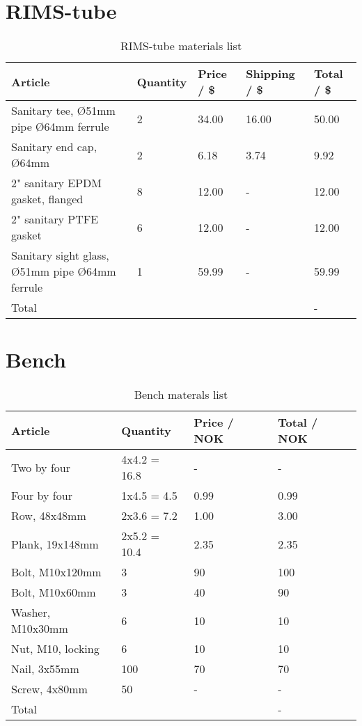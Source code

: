 \documentclass[11pt,fleqn,openany]{book} %
\begin{document}
\newpage

\section{RIMS-tube}

\begin{table}[ht!]
\centering
\begin{tabular}{l l l l l}
\toprule
Article & Quantity & Price / \$ & Shipping / \$ & Total / \$\\
\midrule
Sanitary tee, Ø51mm pipe Ø64mm ferrule & 2 & 34.00 & 16.00 & 50.00 \\
Sanitary end cap, Ø64mm & 2 & 6.18 & 3.74 & 9.92 \\
2" sanitary EPDM gasket, flanged & 8 & 12.00 & - & 12.00 \\
2" sanitary PTFE gasket & 6 & 12.00 & - & 12.00 \\
Sanitary sight glass, Ø51mm pipe Ø64mm ferrule & 1 & 59.99 & - & 59.99\\
\bottomrule
Total & & & & -\\
\end{tabular}
\caption{RIMS-tube materials list}
\end{table}

\section{Bench}

\begin{table}[ht!]
\centering
\begin{tabular}{l l l l}
\toprule
Article & Quantity & Price / NOK & Total / NOK\\
\midrule
Two by four & 4x4.2 = 16.8 & - & - \\
Four by four & 1x4.5 = 4.5 & 0.99 & 0.99 \\
Row, 48x48mm & 2x3.6 = 7.2 & 1.00 & 3.00 \\
Plank, 19x148mm & 2x5.2 = 10.4 & 2.35 & 2.35 \\
Bolt, M10x120mm & 3 & 90 & 100\\
Bolt, M10x60mm & 3 & 40 & 90\\
Washer, M10x30mm & 6 & 10 & 10\\
Nut, M10, locking & 6 & 10 & 10\\
Nail, 3x55mm & 100 & 70 & 70\\
Screw, 4x80mm & 50 & - & -\\
\bottomrule
Total & & & -\\
\end{tabular}
\caption{Bench materals list}
\end{table}
\end{document}
